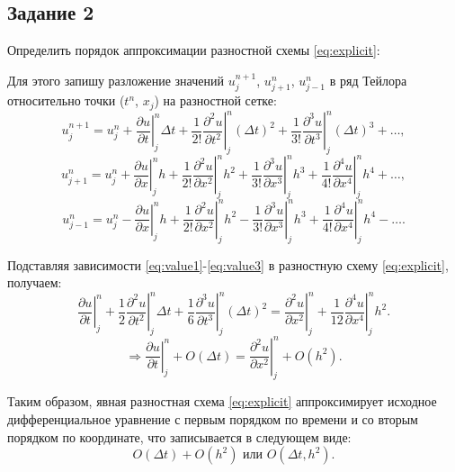 \documentclass[12pt, a4paper]{report}
\begin{document}
	\subsection*{Задание 2}
	\large
	Определить порядок аппроксимации разностной схемы \eqref{eq:explicit}: \par
	Для этого запишу разложение значений $u_{j}^{n+1}$, $u_{j+1}^{n}$, $u_{j-1}^{n}$ в ряд Тейлора относительно точки ($t^{n}$, $x_{j}$) на разностной сетке:
	\begin{equation}\label{eq:value1}
		u_{j}^{n+1} = u_{j}^{n} + \left.\frac{\partial u}{\partial t}\right|_{j}^{n}\Delta t + \left.\frac{1}{2!}\frac{\partial^{2} u}{\partial t^{2}}\right|_{j}^{n}(\Delta t)^{2} + \left.\frac{1}{3!}\frac{\partial^{3} u}{\partial t^{3}}\right|_{j}^{n}(\Delta t)^{3} + \dots,
	\end{equation}
	\begin{equation}\label{eq:value2}
		u_{j+1}^{n} = u_{j}^{n} + \left.\frac{\partial u}{\partial x}\right|_{j}^{n}h + \left.\frac{1}{2!}\frac{\partial^{2} u}{\partial x^{2}}\right|_{j}^{n}h^{2} + \left.\frac{1}{3!}\frac{\partial^{3} u}{\partial x^{3}}\right|_{j}^{n}h^{3} + \left.\frac{1}{4!}\frac{\partial^{4} u}{\partial x^{4}}\right|_{j}^{n}h^{4} + \dots,
	\end{equation}
	\begin{equation}\label{eq:value3}
		u_{j-1}^{n} = u_{j}^{n} - \left.\frac{\partial u}{\partial x}\right|_{j}^{n}h + \left.\frac{1}{2!}\frac{\partial^{2} u}{\partial x^{2}}\right|_{j}^{n}h^{2} - \left.\frac{1}{3!}\frac{\partial^{3} u}{\partial x^{3}}\right|_{j}^{n}h^{3} + \left.\frac{1}{4!}\frac{\partial^{4} u}{\partial x^{4}}\right|_{j}^{n}h^{4} - \dots.
	\end{equation}
	\par
	Подставляя зависимости \eqref{eq:value1}-\eqref{eq:value3} в разностную схему \eqref{eq:explicit}, получаем:
	\begin{equation*}
		\left.\frac{\partial u}{\partial t}\right|_{j}^{n} + \left.\frac{1}{2}\frac{\partial^{2} u}{\partial t^{2}}\right|_{j}^{n}\Delta t + \left.\frac{1}{6}\frac{\partial^{3} u}{\partial t^{3}}\right|_{j}^{n}(\Delta t)^{2} = \left.\frac{\partial^{2} u}{\partial x^{2}}\right|_{j}^{n} + \left.\frac{1}{12}\frac{\partial^{4} u}{\partial x^{4}}\right|_{j}^{n}h^{2}.
	\end{equation*}
	\begin{equation*}
		\Rightarrow \left.\frac{\partial u}{\partial t}\right|_{j}^{n} + O(\Delta t) = \left.\frac{\partial^{2} u}{\partial x^{2}}\right|_{j}^{n} + O(h^{2}).
	\end{equation*}
	\par
	Таким образом, явная разностная схема \eqref{eq:explicit} аппроксимирует исходное дифференциальное уравнение с первым порядком по времени и со вторым порядком по координате, что записывается в следующем виде:
	\begin{equation*}
		O(\Delta t) + O(h^{2}) \text{ или } O(\Delta t, h^{2}).
	\end{equation*}
\end{document}
